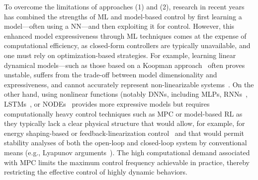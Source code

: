 To overcome the limitations of approaches (1) and (2), research in recent years has combined the strengths of \gls{ML} and model-based control by first learning a model—often using a \gls{NN}—and then exploiting it for control. However, this enhanced model expressiveness through \gls{ML} techniques comes at the expense of computational efficiency, as closed-form controllers are typically unavailable, and one must rely on optimization-based strategies.
For example, learning linear dynamical models—such as those based on a Koopman approach~\citep{bruder2020data, bruder2024koopman} often proves unstable, suffers from the trade-off between model dimensionality and expressiveness, and cannot accurately represent non-linearizable systems~\citep{cenedese2022data}. On the other hand, using nonlinear functions (notably \glspl{DNN}, including \glspl{MLP}, \glspl{RNN}~\citep{thuruthel2018model, sun2022physics}, \glspl{LSTM}~\citep{xie2023dynamic}, or \glspl{NODE}~\citep{kasaei2023data} provides more expressive models but requires computationally heavy control techniques such as \gls{MPC} or model-based \gls{RL} as they typically lack a clear physical structure that would allow, for example, for energy shaping-based or feedback-linearization control~\citep{khalil2002nonlinear} and that would permit stability analyses of both the open-loop and closed-loop system by conventional means (e.g., Lyapunov arguments~\citep{khalil2002nonlinear}). 
The high computational demand associated with \gls{MPC} limits the maximum control frequency achievable in practice, thereby restricting the effective control of highly dynamic behaviors.

